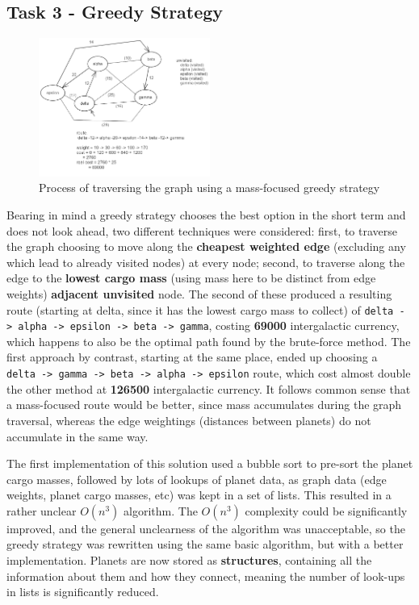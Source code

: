 \documentclass[
]{article}
\begin{document}
\subsection{Task 3 - Greedy Strategy}\label{task-3---greedy-strategy}

\begin{figure}
\centering
\includegraphics[width=0.5\textwidth,height=\textheight]{diagrams/Greedy strategy.png}
\caption{Process of traversing the graph using a mass-focused greedy
strategy}
\end{figure}

Bearing in mind a greedy strategy chooses the best option in the short
term and does not look ahead, two different techniques were considered:
first, to traverse the graph choosing to move along the \textbf{cheapest
weighted edge} (excluding any which lead to already visited nodes) at
every node; second, to traverse along the edge to the \textbf{lowest
cargo mass} (using mass here to be distinct from edge weights)
\textbf{adjacent unvisited} node. The second of these produced a
resulting route (starting at delta, since it has the lowest cargo mass
to collect) of
\texttt{delta\ -\textgreater{}\ alpha\ -\textgreater{}\ epsilon\ -\textgreater{}\ beta\ -\textgreater{}\ gamma},
costing \textbf{69000} intergalactic currency, which happens to also be
the optimal path found by the brute-force method. The first approach by
contrast, starting at the same place, ended up choosing a
\texttt{delta\ -\textgreater{}\ gamma\ -\textgreater{}\ beta\ -\textgreater{}\ alpha\ -\textgreater{}\ epsilon}
route, which cost almost double the other method at \textbf{126500}
intergalactic currency. It follows common sense that a mass-focused
route would be better, since mass accumulates during the graph
traversal, whereas the edge weightings (distances between planets) do
not accumulate in the same way.

The first implementation of this solution used a bubble sort to pre-sort
the planet cargo masses, followed by lots of lookups of planet data, as
graph data (edge weights, planet cargo masses, etc) was kept in a set of
lists. This resulted in a rather unclear \(O(n^3)\) algorithm. The
\(O(n^3)\) complexity could be significantly improved, and the general
unclearness of the algorithm was unacceptable, so the greedy strategy
was rewritten using the same basic algorithm, but with a better
implementation. Planets are now stored as \textbf{structures},
containing all the information about them and how they connect, meaning
the number of look-ups in lists is significantly reduced.
\end{document}
